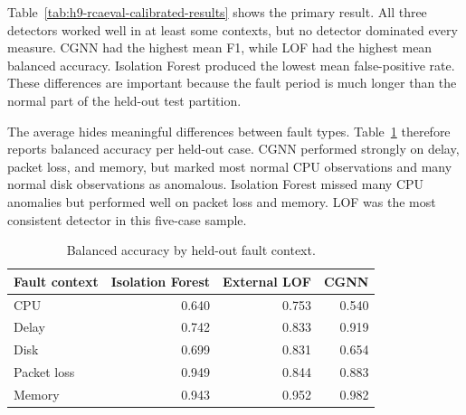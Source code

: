 Table~\ref{tab:h9-rcaeval-calibrated-results} shows the primary result. All three detectors worked well in at least some contexts, but no detector dominated every measure. CGNN had the highest mean F1, while LOF had the highest mean balanced accuracy. Isolation Forest produced the lowest mean false-positive rate. These differences are important because the fault period is much longer than the normal part of the held-out test partition.

\begin{table}[H]
    \centering
    \scriptsize
    \caption{Mean results for the five held-out temporal tests.}
    \label{tab:h9-rcaeval-calibrated-results}
\end{table}

The average hides meaningful differences between fault types. Table~\ref{tab:h9-rcaeval-balanced-by-fault} therefore reports balanced accuracy per held-out case. CGNN performed strongly on delay, packet loss, and memory, but marked most normal CPU observations and many normal disk observations as anomalous. Isolation Forest missed many CPU anomalies but performed well on packet loss and memory. LOF was the most consistent detector in this five-case sample.

\begin{table}[H]
    \centering
    \small
    \caption{Balanced accuracy by held-out fault context.}
    \label{tab:h9-rcaeval-balanced-by-fault}
    \begin{tabular}{|l|r|r|r|}
        \hline
        Fault context & Isolation Forest & External LOF & CGNN \\
        \hline
        CPU & 0.640 & 0.753 & 0.540 \\
        Delay & 0.742 & 0.833 & 0.919 \\
        Disk & 0.699 & 0.831 & 0.654 \\
        Packet loss & 0.949 & 0.844 & 0.883 \\
        Memory & 0.943 & 0.952 & 0.982 \\
        \hline
    \end{tabular}
\end{table}

